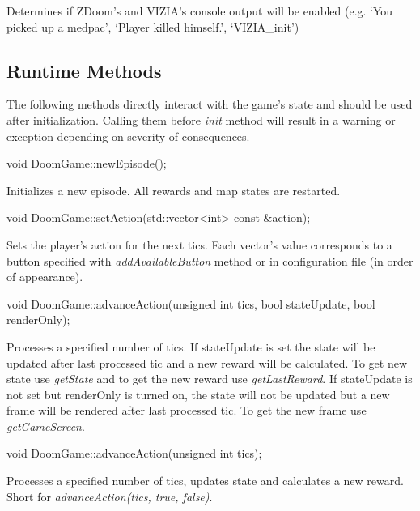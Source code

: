 	Determines if ZDoom's and VIZIA's console output will be enabled (e.g. `You picked up a medpac', `Player killed himself.', `VIZIA\_init')


\vspace{20pt}
\subsection{Runtime Methods}\label{subsec:runtime_methods}
	The following methods directly interact with the game's state and should be used after initialization. Calling them before \emph{init} method will result in a warning or exception depending on severity of consequences. 

\vspace{20pt}
\begin{clinee}
void DoomGame::newEpisode();
\end{clinee}

	Initializes a new episode. All rewards and map states are restarted.


\vspace{20pt}
\begin{clinee}
	void DoomGame::setAction(std::vector<int> const &action);
\end{clinee}

	Sets the player's action for the next tics.
	Each vector's value corresponds to a button specified with \emph{addAvailableButton} method or in configuration file (in order of appearance).


\vspace{20pt}
\begin{clinee}
	void DoomGame::advanceAction(unsigned int tics, bool stateUpdate, bool renderOnly);
\end{clinee}

    	Processes a specified number of tics. If stateUpdate is set the state will be updated after last processed tic and a new reward will be calculated. To get new state use \emph{getState} and to get the new reward use  \emph{getLastReward}. If stateUpdate is not set but renderOnly is turned on, the state will not be updated but a new frame will be rendered after last processed tic. To get the new frame use \emph{getGameScreen}.

\vspace{20pt}
\begin{clinee}
	void DoomGame::advanceAction(unsigned int tics);
\end{clinee}

    	Processes a specified number of tics, updates state and calculates a new reward. Short for \emph{advanceAction(tics, true, false)}.


